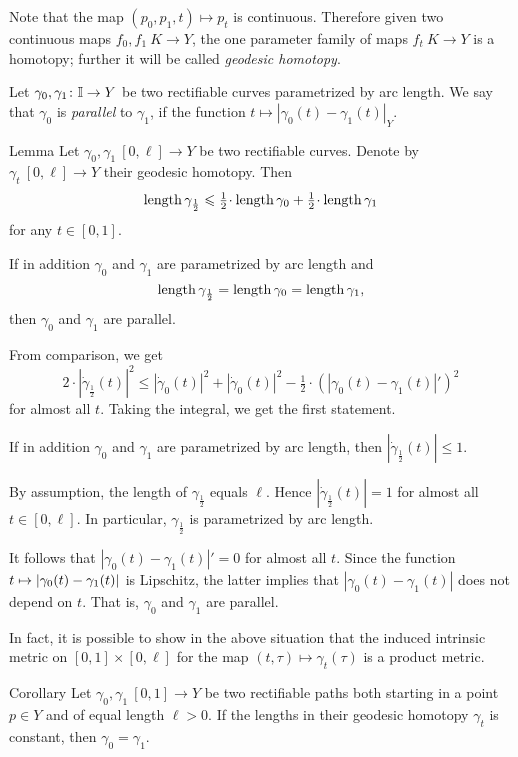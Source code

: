 \documentclass{article}
\begin{document}
Note that the map $(p_0,p_1,t)\mapsto p_t$ is continuous.
Therefore given two continuous maps $f_0,f_1\:K\to Y$,
the one parameter family of maps $f_t\:K\to Y$ is a homotopy;
further it will be called \emph{geodesic homotopy}.

Let $\gamma_{0}, \gamma_1\colon\mathbb{I}\to Y$ be two rectifiable curves parametrized by arc length. 
We say that  $\gamma_{0}$ is {\em parallel} to $\gamma_{1}$, if the function $t\mapsto |\gamma_{0}(t)-\gamma_{1}(t)|_Y$.


\begin{thm}{Lemma}\label{lem:parpaths}
Let $\gamma_0,\gamma_1\:[0,\ell]\to Y$ be two rectifiable curves. 
Denote by $\gamma_t\:[0,\ell]\to Y$ their geodesic homotopy.
Then
\[\length\gamma_{\frac12}
\le \tfrac12\cdot\length\gamma_0 +\tfrac12\cdot\length\gamma_1\]
for any $t\in [0,1]$.

If in addition $\gamma_0$ and $\gamma_1$ are parametrized by arc length and 
\[\mathop{\rm length}\nolimits\gamma_{\frac12}
=\mathop{\rm length}\nolimits\gamma_0
=\mathop{\rm length}\nolimits\gamma_1,\] 
then $\gamma_{0}$ and $\gamma_{1}$ are parallel. 
\end{thm}

From comparison, we get
\[2\cdot|\dot\gamma_{\frac12}(t)|^2
\le
|\dot\gamma_{0}(t)|^2
+|\dot\gamma_{0}(t)|^2
-\tfrac12\cdot(|\gamma_{0}(t)-\gamma_{1}(t)|')^2\] 
for almost all $t$.
Taking the integral, we get the first statement.

If in addition $\gamma_0$ and $\gamma_1$ are parametrized by arc length, 
then $|\dot\gamma_{\frac12}(t)|\le 1$.

By assumption, the length of $\gamma_{\frac12}$ equals $\ell$. 
Hence $|\dot\gamma_{\frac12}(t)|=1$ for almost all $t\in[0,\ell]$. 
In particular, $\gamma_{\frac12}$
is parametrized by arc length. 

It follows that $|\gamma_{0}(t)-\gamma_{1}(t)|'=0$ for almost all $t$.
Since the function $t\zz\mapsto |\gamma_{0}(t)-\gamma_{1}(t)|$ is Lipschitz,
the latter  implies that $|\gamma_{0}(t)-\gamma_{1}(t)|$ does not depend on $t$.
That is, $\gamma_{0}$ and $\gamma_{1}$ are parallel.
\qeds

In fact, it is possible to show in the above situation that the induced intrinsic metric on $[0,1]\times[0,\ell]$
for the map $(t,\tau)\mapsto \gamma_t(\tau)$ is a product metric.

\begin{thm}{Corollary}\label{cor:parpaths}
Let $\gamma_0,\gamma_1\:[0,1]\to Y$ be two rectifiable paths both starting in a point $p\in Y$ and of equal length $\ell>0$. 
If the lengths in their geodesic homotopy $\gamma_t$ is constant, then $\gamma_{0}=\gamma_{1}$.
\end{thm}
\end{document}
